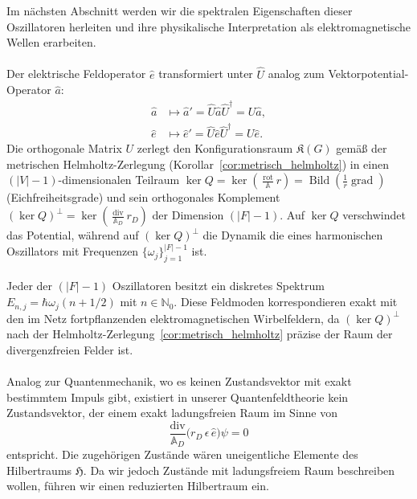 \documentclass[11pt,a4paper,leqno]{report}
\numberwithin{equation}{chapter}
\begin{document}
Im nächsten Abschnitt werden wir die spektralen Eigenschaften dieser Oszillatoren 
herleiten und ihre physikalische Interpretation als elektromagnetische Wellen erarbeiten.\\
\\
Der elektrische Feldoperator $\hat{e}$ transformiert unter $\hat{U}$ analog zum 
Vektorpotential-Operator $\hat{a}$:
\begin{align}
	\hat{a} &\mapsto \hat{a}' = \hat{U}\hat{a}\hat{U}^\dagger = U\hat{a},\\
	\hat{e} &\mapsto \hat{e}' = \hat{U}\hat{e}\hat{U}^\dagger = U\hat{e}.
\end{align}
Die orthogonale Matrix $U$ zerlegt den Konfigurationsraum $\mathfrak{K}(G)$ gemäß 
der metrischen Helmholtz-Zerlegung (Korollar~\ref{cor:metrisch_helmholtz}) in einen 
$(|V|-1)$-dimensionalen Teilraum 
$\ker Q = \ker(\frac{\operatorname{rot}}{\mathbb{A}}r) = \operatorname{Bild}(\frac{1}{r}\operatorname{grad})$ 
(Eichfreiheitsgrade) und sein orthogonales Komplement 
$(\ker Q)^\perp = \ker(\frac{\operatorname{div}}{\mathbb{A}_D}r_D)$ der Dimension $(|F|-1)$. 
Auf $\ker Q$ verschwindet das Potential, während auf $(\ker Q)^\perp$ die Dynamik 
die eines harmonischen Oszillators mit Frequenzen $\{\omega_j\}_{j=1}^{|F|-1}$ ist.\\
\\
Jeder der $(|F|-1)$ Oszillatoren besitzt ein diskretes Spektrum 
$E_{n,j} = \hbar\omega_j(n + 1/2)$ mit $n \in \mathbb{N}_0$. Diese Feldmoden 
korrespondieren exakt mit den im Netz fortpflanzenden elektromagnetischen Wirbelfeldern, 
da $(\ker Q)^\perp$ nach der Helmholtz-Zerlegung~\ref{cor:metrisch_helmholtz} 
präzise der Raum der divergenzfreien Felder ist.\\
\\
Analog zur Quantenmechanik, wo es keinen Zustandsvektor mit exakt bestimmtem Impuls 
gibt, existiert in unserer Quantenfeldtheorie kein Zustandsvektor, der einem exakt 
ladungsfreien Raum im Sinne von
\begin{equation}
	\frac{\mathrm{div}}{\mathbb{A}_D}\bigl(r_D\,\epsilon\,\hat{e}\bigr)\psi = 0
\end{equation}
entspricht. Die zugehörigen Zustände wären uneigentliche Elemente des Hilbertraums 
$\mathfrak{H}$. Da wir jedoch Zustände mit ladungsfreiem Raum beschreiben wollen, 
führen wir einen reduzierten Hilbertraum ein.
\end{document}

